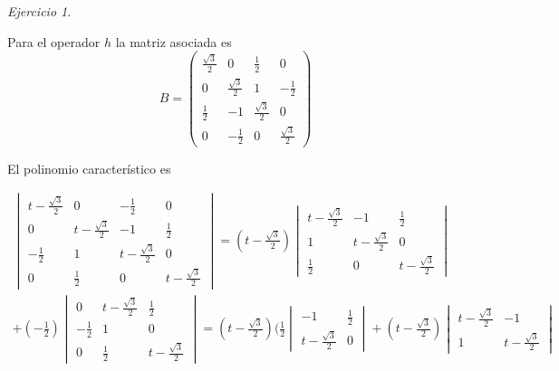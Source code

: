 \documentclass[11pt,a4paper]{article}
\theoremstyle{definition}
\theoremstyle{remark}
\newtheorem{exc}{Ejercicio}
\begin{document}
\begin{exc}
\begin{enumerate}
	    Para el operador $ h $ la matriz asociada es \begin{equation}
	    	B= \begin{pmatrix}
	    	\frac{\sqrt{3}}{2} & 0 & \frac{1}{2} & 0
	    	\\ 0 & \frac{\sqrt{3}}{2} & 1 & -\frac{1}{2} 
	    	\\ \frac{1}{2} & -1 & \frac{\sqrt{3}}{2} & 0
	    	\\ 0 & -\frac{1}{2} & 0 & \frac{\sqrt{3}}{2}
	    	\end{pmatrix} \nonumber
	    	\end{equation}
		
		El polinomio característico es
			
			\begin{multline}
			    	\begin{vmatrix}
			    	t-\frac{\sqrt{3}}{2} & 0 & -\frac{1}{2} & 0
			    	\\ 0 & t-\frac{\sqrt{3}}{2} & -1 & \frac{1}{2} 
			    	\\ -\frac{1}{2} & 1 & t-\frac{\sqrt{3}}{2} & 0
			    	\\ 0 & \frac{1}{2} & 0 & t-\frac{\sqrt{3}}{2}
			    	\end{vmatrix} = (t-\frac{\sqrt{3}}{2})
			    	\begin{vmatrix}
		 		    	t-\frac{\sqrt{3}}{2} & -1 & \frac{1}{2} 
		 		    	\\ 1 & t-\frac{\sqrt{3}}{2} & 0
		 		    	\\ \frac{1}{2} & 0 & t-\frac{\sqrt{3}}{2}
		 		    \end{vmatrix}\nonumber
		 		    \\+(-\frac{1}{2})\begin{vmatrix}
		 		    	    	0 & t-\frac{\sqrt{3}}{2} & \frac{1}{2} 
		 		    	    	\\ -\frac{1}{2} & 1 & 0
		 		    	    	\\ 0 & \frac{1}{2} &  t-\frac{\sqrt{3}}{2}
		 		    	    	\end{vmatrix} = (t-\frac{\sqrt{3}}{2})(\frac{1}{2}\begin{vmatrix}
		 		    	    	 		    	 -1 & \frac{1}{2} 
		 		    	    	 		    	\\t-\frac{\sqrt{3}}{2} & 0
		 		    	    	 		    \end{vmatrix}+(t-\frac{\sqrt{3}}{2})\begin{vmatrix}
		 		    	    	 		     		    	t-\frac{\sqrt{3}}{2} & -1 
		 		    	    	 		     		    	\\ 1 & t-\frac{\sqrt{3}}{2}

\end{vmatrix}
\end{multline}
\end{enumerate}
\end{exc}
\end{document}
